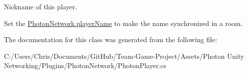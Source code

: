 Nickname of this player. 

Set the \hyperlink{class_photon_network_abb168e543c15731ec4de869d3a1ad8f4}{Photon\+Network.\+player\+Name} to make the name synchronized in a room.

The documentation for this class was generated from the following file\+:\begin{DoxyCompactItemize}
\item 
C\+:/\+Users/\+Chris/\+Documents/\+Git\+Hub/\+Team-\/\+Game-\/\+Project/\+Assets/\+Photon Unity Networking/\+Plugins/\+Photon\+Network/Photon\+Player.\+cs\end{DoxyCompactItemize}
